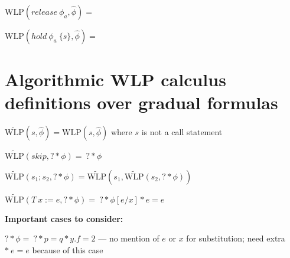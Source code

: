 \documentclass {article}
\newcommand{\lcar}{\left<}
\newcommand{\rcar}{\right>}
\newcommand{\fphi}{\widehat{\phi}}
\newcommand{\wlp}[2]{\text{WLP}(#1,#2)}
\newcommand{\twlp}[2]{\widetilde{\text{WLP}}(#1,#2)}
\begin{document}
%	
%
%
%
%
%
%

\vspace{0.5cm}

$\wlp{release \ \phi_a}{\fphi} = $

\vspace{0.5cm}

$\wlp{hold \ \phi_a \ \{s\}}{\fphi} = $

\section{Algorithmic WLP calculus definitions over gradual formulas}
\hspace{0.5cm}

$\twlp{s}{\fphi} = \wlp{s}{\fphi} $ where $s$ is not a call statement

\vspace{0.5cm}

$\twlp{skip}{? \ast \phi} = \ ? \ast \phi$

\vspace{0.5cm}

$\twlp{s_1;s_2}{? \ast \phi} = \twlp{s_1}{\twlp{s_2}{? \ast \phi}} $

\vspace{0.5cm}

$\twlp{T \ x := e}{? \ast \phi} = \ ? \ast \phi[e/x] \ast e = e$

\textbf{Important cases to consider:}

$? \ast \phi = \ ? \ast p = q \ast y.f = 2$ --- no mention of $e$ or $x$ for substitution; need extra $\ast \ e = e$ because of this case
\end{document}
